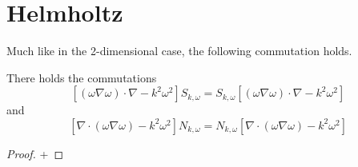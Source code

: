 \documentclass[]{article}
\begin{document}
\section{Helmholtz}

Much like in the 2-dimensional case, the following commutation holds.
\begin{The}
	There holds the commutations
	\[\left[(\omega \nabla \omega)\cdot \nabla - k^2 \omega^2\right]  S_{k,\omega} =S_{k,\omega} \left[(\omega \nabla \omega)\cdot \nabla - k^2 \omega^2\right]\]
	and 
	\[\left[\nabla \cdot (\omega \nabla \omega)  - k^2 \omega^2\right] N_{k,\omega} = N_{k,\omega} \left[\nabla \cdot (\omega \nabla \omega)  - k^2 \omega^2\right] \]
\end{The}
\begin{proof}
	+
\end{proof}




\end{document}
